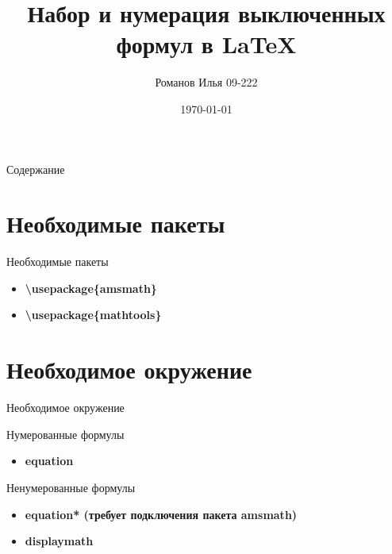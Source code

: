 \documentclass[aspectratio=169]{beamer}
\title{Набор и нумерация выключенных формул в \LaTeX}
\author{Романов Илья 09-222}
\date{\today}
\begin{document}
\begin{frame}
    \titlepage 
\end{frame}

\logo{}


\begin{frame}{Содержание}
    \tiny
    \tableofcontents
\end{frame}

\section{Необходимые пакеты}
\begin{frame}{Необходимые пакеты}
    \begin{itemize}
        \item \bf{\textbackslash usepackage\{amsmath\}}
        \item \bf{\textbackslash usepackage\{mathtools\}}
    \end{itemize}
\end{frame}

\section{Необходимое окружение}
\begin{frame}{Необходимое окружение}
    \begin{minipage}[t]{0.45\textwidth}
        \begin{block}{Нумерованные формулы}
            \begin{itemize}
                \item \bf{equation}
            \end{itemize}
        \end{block}
    \end{minipage}

    \begin{minipage}[t]{0.45\textwidth}
        \begin{block}{Ненумерованные формулы}
            \begin{itemize}
                \item \bf{equation*} (требует подключения пакета amsmath)
                \item \bf{displaymath}
            \end{itemize}
        \end{block}
    \end{minipage}
\end{frame}
\end{document}
